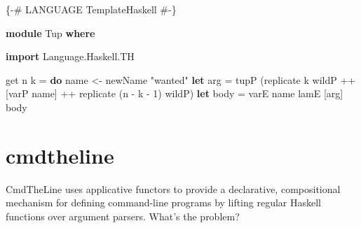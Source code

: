 \documentclass[]{article}
\newenvironment{Shaded}{}{}
\newcommand{\KeywordTok}[1]{\textcolor[rgb]{0.00,0.44,0.13}{\textbf{{#1}}}}
\newcommand{\DataTypeTok}[1]{\textcolor[rgb]{0.56,0.13,0.00}{{#1}}}
\newcommand{\DecValTok}[1]{\textcolor[rgb]{0.25,0.63,0.44}{{#1}}}
\newcommand{\StringTok}[1]{\textcolor[rgb]{0.25,0.44,0.63}{{#1}}}
\newcommand{\OtherTok}[1]{\textcolor[rgb]{0.00,0.44,0.13}{{#1}}}
\newcommand{\FunctionTok}[1]{\textcolor[rgb]{0.02,0.16,0.49}{{#1}}}
\newcommand{\NormalTok}[1]{{#1}}
\begin{document}
\begin{Shaded}
\begin{Highlighting}[]
\OtherTok{\{-# LANGUAGE TemplateHaskell #-\}}

\KeywordTok{module} \DataTypeTok{Tup} \KeywordTok{where}

\KeywordTok{import} \NormalTok{Language.Haskell.TH}

\NormalTok{get n k }\FunctionTok{=} \KeywordTok{do}
  \NormalTok{name }\OtherTok{<-} \NormalTok{newName }\StringTok{"wanted"}
  \KeywordTok{let} \NormalTok{arg }\FunctionTok{=} \NormalTok{tupP (}\FunctionTok{replicate} \NormalTok{k wildP }\FunctionTok{++}
                  \NormalTok{[varP name] }\FunctionTok{++} \FunctionTok{replicate} \NormalTok{(n }\FunctionTok{-} \NormalTok{k }\FunctionTok{-} \DecValTok{1}\NormalTok{) wildP)}
  \KeywordTok{let} \NormalTok{body }\FunctionTok{=} \NormalTok{varE name}
  \NormalTok{lamE [arg] body}
\end{Highlighting}
\end{Shaded}

\begin{Shaded}
\end{Shaded}

\section{cmdtheline}

CmdTheLine uses applicative functors to provide a declarative,
compositional mechanism for defining command-line programs by lifting
regular Haskell functions over argument parsers. What's the problem?
\end{document}
